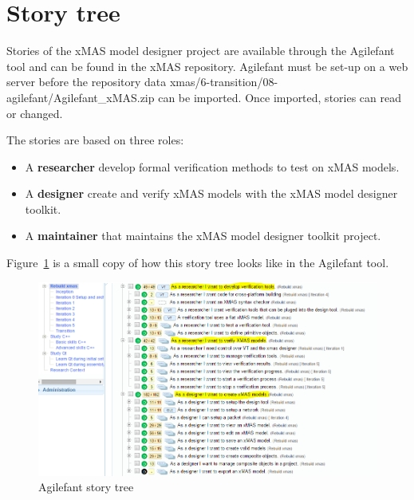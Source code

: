 \section{Story tree}

Stories of the xMAS model designer project are available through the Agilefant
tool and can be found in the xMAS repository. Agilefant must be set-up on a web
server before the repository data xmas/6-transition/08-agilefant/Agilefant\_xMAS.zip
can be imported. Once imported, stories can read or changed.

The stories are based on three roles:
\begin{itemize}
\item A \textbf{researcher} develop formal verification methods to test on xMAS models.
\item A \textbf{designer} create and verify xMAS models with the xMAS model designer toolkit. 
\item A \textbf{maintainer} that maintains the xMAS model designer toolkit project. 
\end{itemize}

Figure~\ref{fig:story-tree} is a small copy of how this story tree looks like in the Agilefant tool.


\begin{figure}[here]
\begin{center}	
	\includegraphics[width=.70\linewidth]{pictures/story-tree}
	\caption{Agilefant story tree}
	\label{fig:story-tree}
\end{center}
\end{figure}

